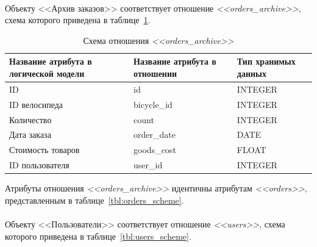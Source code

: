 \paragraph{}
Объекту <<Архив заказов>> соответствует отношение \textit{<<orders\_archive>>}, схема которого приведена в
таблице~\ref{tbl:orders_archive_scheme}.
\begin{table}[h!]
  \caption{Схема отношения \textit{<<orders\_archive>>}}
  \label{tbl:orders_archive_scheme}
  \small{
    \centering
    \begin{tabular}{| p{} | p{} | p{} |}
      \hline
      Название атрибута в \newline логической модели &
      Название атрибута в \newline отношении &
      Тип хранимых данных \\

      \hline
      ID & id & INTEGER \\

      \hline
      ID велосипеда & bicycle\_id & INTEGER \\

      \hline
      Количество & count & INTEGER \\

      \hline
      Дата заказа & order\_date & DATE \\

      \hline
      Стоимость товаров & goods\_cost & FLOAT \\

      \hline
      ID пользователя & user\_id & INTEGER \\

      \hline
    \end{tabular}
    }
\end{table}

Атрибуты отношения \textit{<<orders\_archive>>} идентичны атрибутам
\textit{<<orders>>}, представленным в таблице~\ref{tbl:orders_scheme}.

\paragraph{}

Объекту <<Пользователи>> соответствует отношение \textit{<<users>>}, схема которого приведена в
таблице~\ref{tbl:users_scheme}.

